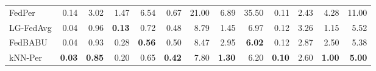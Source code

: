 \documentclass[conference]{IEEEtran}
\begin{document}
\begin{table}[t]
\begin{tabular}{lrrrrrrrrrrrr}
FedPer & 0.14 & 3.02 & 1.47 & 6.54 & 0.67 & 21.00 & 6.89 & 35.50 & 0.11 & 2.43 & 4.28 & 11.00 \\
\rowcolor{gray!10} LG-FedAvg & 0.04 & 0.96 & \textbf{0.13} & 0.72 & 0.48 & 8.79 & 1.45 & 6.97 & 0.12 & 3.26 & 1.15 & 5.52 \\
FedBABU & 0.04 & 0.93 & 0.28 & \textbf{0.56} & 0.50 & 8.47 & 2.95 & \textbf{6.02} & 0.12 & 2.87 & 2.50 & 5.38 \\
\rowcolor{gray!10} kNN-Per & \textbf{0.03} & \textbf{0.85} & 0.20 & 0.65 & \textbf{0.42} & 7.80 & \textbf{1.30} & 6.20 & \textbf{0.10} & 2.60 & \textbf{1.00} & \textbf{5.00} \\
\bottomrule
\end{tabular}
\end{table}
\end{document}
